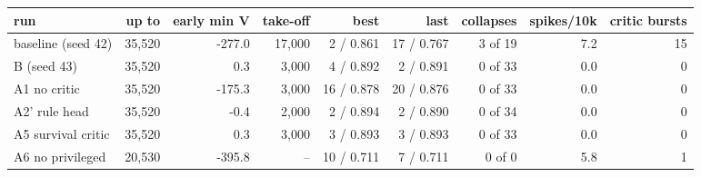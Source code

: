 \begin{tabular}{lrrrrrrrr}\toprule
run & up to & early min V & take-off & best & last & collapses & spikes/10k & critic bursts \\\midrule
baseline (seed 42) & 35,520 & -277.0 & 17,000 & 2 / 0.861 & 17 / 0.767 & 3 of 19 & 7.2 & 15 \\
B (seed 43) & 35,520 & 0.3 & 3,000 & 4 / 0.892 & 2 / 0.891 & 0 of 33 & 0.0 & 0 \\
A1 no critic & 35,520 & -175.3 & 3,000 & 16 / 0.878 & 20 / 0.876 & 0 of 33 & 0.0 & 0 \\
A2' rule head & 35,520 & -0.4 & 2,000 & 2 / 0.894 & 2 / 0.890 & 0 of 34 & 0.0 & 0 \\
A5 survival critic & 35,520 & 0.3 & 3,000 & 3 / 0.893 & 3 / 0.893 & 0 of 33 & 0.0 & 0 \\
A6 no privileged & 20,530 & -395.8 & -- & 10 / 0.711 & 7 / 0.711 & 0 of 0 & 5.8 & 1 \\
\bottomrule\end{tabular}
